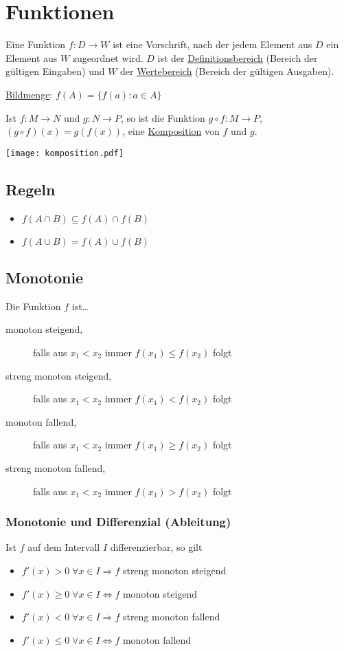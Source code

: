 \section{Funktionen}
Eine Funktion $f: D \rightarrow W$ ist eine Vorschrift, nach der jedem Element aus
$D$ ein Element aus $W$ zugeordnet wird. $D$ ist der \underline{Definitionsbereich}
(Bereich der gültigen Eingaben) und $W$ der \underline{Wertebereich}
(Bereich der gültigen Ausgaben).

\underline{Bildmenge}: $f(A) = \{f(a) : a \in A \}$

Ist $f: M \rightarrow N$ und $g: N \rightarrow P$, so ist die Funktion $g \circ f: M \rightarrow P$,
$(g \circ f)(x) = g(f(x))$, eine \underline{Komposition} von $f$ und $g$.

\texttt{[image: komposition.pdf]}

\subsection{Regeln}
\begin{itemize}
	\item $f(A \cap B) \subseteq f(A) \cap f(B)$
	\item $f(A \cup B) = f(A) \cup f(B)$
\end{itemize}

\subsection{Monotonie}
Die Funktion $f$ ist\ldots
\begin{description}
	\item[monoton steigend,] falls aus $x_1 < x_2$ immer $f(x_1) \leq f(x_2)$ folgt
	\item[streng monoton steigend,] falls aus $x_1 < x_2$ immer $f(x_1) < f(x_2)$ folgt
	\item[monoton fallend,] falls aus $x_1 < x_2$ immer $f(x_1) \geq f(x_2)$ folgt
	\item[streng monoton fallend,] falls aus $x_1 < x_2$ immer $f(x_1) > f(x_2)$ folgt
\end{description}

\subsubsection{Monotonie und Differenzial (Ableitung)}
Ist $f$ auf dem Intervall $I$ differenzierbar, so gilt
\begin{itemize}
	\item $f'(x) > 0 \; \forall x \in I \Rightarrow f$ streng monoton steigend
	\item $f'(x) \geq 0 \; \forall x \in I \Leftrightarrow f$ monoton steigend
	\item $f'(x) < 0 \; \forall x \in I \Rightarrow f$ streng monoton fallend
	\item $f'(x) \leq 0 \; \forall x \in I \Leftrightarrow f$ monoton fallend
\end{itemize}

